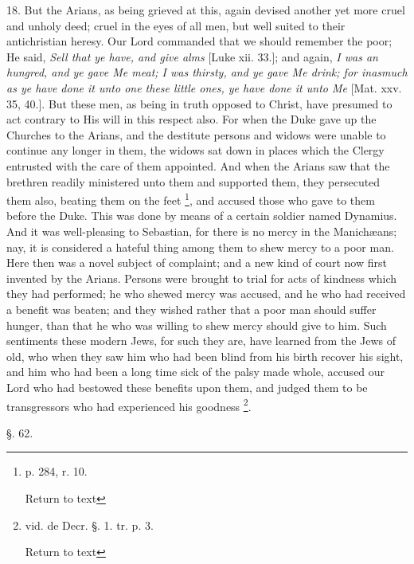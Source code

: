 18. But the Arians, as being grieved at this,
again devised another yet more cruel and unholy deed; cruel in the
eyes of all men, but well suited to their antichristian heresy. Our
Lord commanded that we should remember the poor; He said, \emph{Sell that
ye have, and give alms} [Luke xii. 33.]; and again, \emph{I was an
hungred, and ye gave Me meat; I was thirsty, and ye gave Me drink; for
inasmuch as ye have done it unto one these little ones, ye have done
it unto Me} [Mat. xxv. 35, 40.]. But these men, as being in truth
opposed to Christ, have presumed to act contrary to His will in this
respect also. For when the Duke gave up the Churches to the Arians,
and the destitute persons and widows were unable to continue any
longer in them, the widows sat down in places which the Clergy
entrusted with the care of them appointed. And when the Arians saw
that the brethren readily ministered unto them and supported them,
they persecuted them also, beating them on the feet \footnote{p. 284, r. 10.

Return to text}, and
accused those who gave to them before the Duke. This was done by means
of a certain soldier named Dynamius. And it was well-pleasing to
Sebastian, for there is no mercy in the Manichæans; nay, it is
considered a hateful thing among them to shew mercy to a poor man.
Here then was a novel subject of complaint; and a new kind of court
now first invented by the Arians. Persons were brought to trial for
acts of kindness which they had performed; he who shewed mercy was
accused, and he who had received a benefit was beaten; and they wished
rather that a poor man should suffer hunger, than that he who was
willing to shew mercy should give to him. Such sentiments these modern
Jews, for such they are, have learned from the Jews of old, who when
they saw him who had been blind from his birth recover his sight, and
him who had been a long time sick of the palsy made whole, accused our
Lord who had bestowed these benefits upon them, and judged them to be
transgressors who had experienced his goodness \footnote{vid. de Decr. §. 1. tr. p. 3.

Return to text}.

§. 62.

